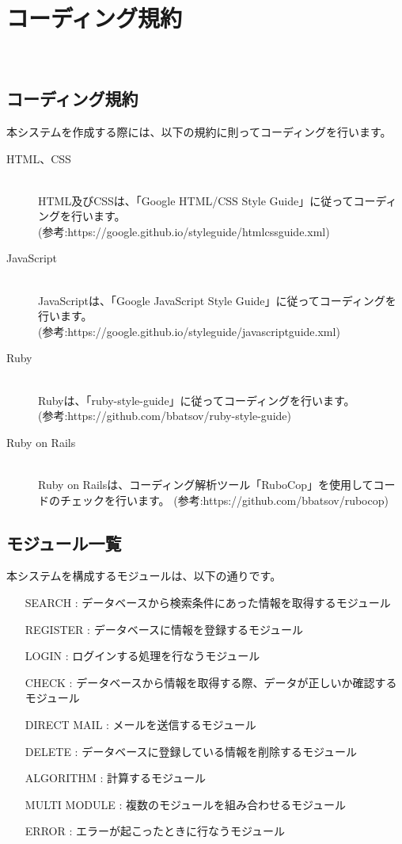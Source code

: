 \documentclass[a4j,titlepage]{jarticle}
\begin{document}
\section{コーディング規約}
​
\subsection{コーディング規約}
本システムを作成する際には、以下の規約に則ってコーディングを行います。
\begin{description}
\item[HTML、CSS]\mbox{}\\
HTML及びCSSは、「Google HTML/CSS Style Guide」に従ってコーディングを行います。\\
(参考:https://google.github.io/styleguide/htmlcssguide.xml)
​
\item[JavaScript]\mbox{}\\
JavaScriptは、「Google JavaScript Style Guide」に従ってコーディングを行います。\\
(参考:https://google.github.io/styleguide/javascriptguide.xml)
​
\item[Ruby]\mbox{}\\
Rubyは、「ruby-style-guide」に従ってコーディングを行います。\\
(参考:https://github.com/bbatsov/ruby-style-guide)
​
\item[Ruby on Rails]\mbox{}\\
Ruby on Railsは、コーディング解析ツール「RuboCop」を使用してコードのチェックを行います。
(参考:https://github.com/bbatsov/rubocop)
\end{description}

\subsection{モジュール一覧}
本システムを構成するモジュールは、以下の通りです。
\begin{enumerate}
\item [SEARCH] : データベースから検索条件にあった情報を取得するモジュール
\item [REGISTER] : データベースに情報を登録するモジュール
\item [LOGIN] : ログインする処理を行なうモジュール
\item [CHECK] : データベースから情報を取得する際、データが正しいか確認するモジュール
\item [DIRECT MAIL] : メールを送信するモジュール
\item [DELETE] : データベースに登録している情報を削除するモジュール
\item [ALGORITHM] : 計算するモジュール
\item [MULTI MODULE] : 複数のモジュールを組み合わせるモジュール
\item [ERROR] : エラーが起こったときに行なうモジュール
\end{enumerate}
\end{document}
